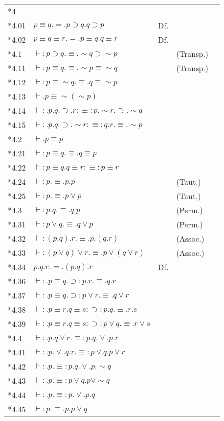 \noindent\begin{tabular}[t]{l@{\quad}l@{\quad}l@{\quad}ll}
{*4}\\
{*4.01} & $p\equiv{q}.=.p\supset{q}.q\supset{p}$ & Df.\\
{*4.02} & $p\equiv{q}\equiv{r}.=.p\equiv{q}.q\equiv{r}$ & Df.\\
{*4.1} & $\vdash:p\supset{q}.\equiv.\sim{q}\supset\sim{p}$ && (Transp.)\\
{*4.11} & $\vdash:p\equiv{q}.\equiv.\sim{p}\equiv\sim{q}$ && (Transp.)\\
{*4.12} & $\vdash:p\equiv\sim{q}.\equiv.q\equiv\sim{p}$\\
{*4.13} & $\vdash.p\equiv\sim(\sim{p})$\\
{*4.14} & $\vdash:.p.q.\supset.r:\equiv:p.\sim{r}.\supset.\sim{q}$\\
{*4.15} & $\vdash:.p.q.\supset.\sim{r}:\equiv:q.r.\equiv.\sim{p}$\\
{*4.2} & $\vdash.p\equiv{p}$\\
{*4.21} & $\vdash:p\equiv{q}.\equiv.q\equiv{p}$\\
{*4.22} & $\vdash:p\equiv{q}.q\equiv{r}:\equiv:p\equiv{r}$\\
{*4.24} & $\vdash:p.\equiv.p.p$ && (Taut.)\\
{*4.25} & $\vdash:p.\equiv.p\vee{p}$ && (Taut.)\\
{*4.3} & $\vdash:p.q.\equiv.q.p$ && (Perm.)\\
{*4.31} & $\vdash:p\vee{q}.\equiv.q\vee{p}$ && (Perm.)\\
{*4.32} & $\vdash:(p.q).r.\equiv.p.(q.r)$ && (Assoc.)\\
{*4.33} & $\vdash:(p\vee{q})\vee{r}.\equiv.p\vee(q\vee{r})$ && (Assoc.)\\
{*4.34} & $p.q.r.=.(p.q).r$ & Df.\\
{*4.36} & $\vdash:.p\equiv{q}.\supset:p.r.\equiv.q.r$\\
{*4.37} & $\vdash:.p\equiv{q}.\supset:p\vee{r}.\equiv.q\vee{r}$\\
{*4.38} & $\vdash:.p\equiv{r}.q\equiv{s}:\supset:p.q.\equiv.r.s$\\
{*4.39} & $\vdash:.p\equiv{r}.q\equiv{s}:\supset:p\vee{q}.\equiv.r\vee{s}$\\
{*4.4} & $\vdash:.p.q\vee{r}.\equiv:p.q.\vee.p.r$\\
{*4.41} & $\vdash:.p.\vee.q.r.\equiv:p\vee{q}.p\vee{r}$\\
{*4.42} & $\vdash:.p.\equiv:p.q.\vee.p.\sim{q}$\\
{*4.43} & $\vdash:.p.\equiv:p\vee{q}.p\vee\sim{q}$\\
{*4.44} & $\vdash:.p.\equiv:p.\vee.p.q$\\
{*4.45} & $\vdash:p.\equiv.p.p\vee{q}$\\
\end{tabular}